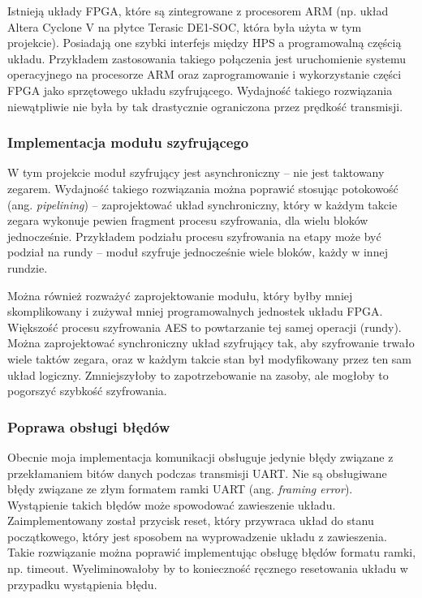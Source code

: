 Istnieją układy FPGA, które są zintegrowane z procesorem ARM (np. układ Altera Cyclone V na płytce Terasic DE1-SOC, która była użyta w tym projekcie). Posiadają one szybki interfejs między HPS a programowalną częścią układu. Przykładem zastosowania takiego połączenia jest uruchomienie systemu operacyjnego na procesorze ARM oraz zaprogramowanie i wykorzystanie części FPGA jako sprzętowego układu szyfrującego. Wydajność takiego rozwiązania niewątpliwie nie była by tak drastycznie ograniczona przez prędkość transmisji.

\subsubsection{Implementacja modułu szyfrującego}
W tym projekcie moduł szyfrujący jest asynchroniczny -- nie jest taktowany zegarem. Wydajność takiego rozwiązania można poprawić stosując potokowość (ang. \textit{pipelining}) -- zaprojektować układ synchroniczny, który w każdym takcie zegara wykonuje pewien fragment procesu szyfrowania, dla wielu bloków jednocześnie. Przykładem podziału procesu szyfrowania na etapy może być podział na rundy -- moduł szyfruje jednocześnie wiele bloków, każdy w innej rundzie.

Można również rozważyć zaprojektowanie modułu, który byłby mniej skomplikowany i zużywał mniej programowalnych jednostek układu FPGA. Większość procesu szyfrowania AES to powtarzanie tej samej operacji (rundy). Można zaprojektować synchroniczny układ szyfrujący tak, aby szyfrowanie trwało wiele taktów zegara, oraz w każdym takcie stan był modyfikowany przez ten sam układ logiczny. Zmniejszyłoby to zapotrzebowanie na zasoby, ale mogłoby to pogorszyć szybkość szyfrowania.

\subsubsection{Poprawa obsługi błędów}
Obecnie moja implementacja komunikacji obsługuje jedynie błędy związane z przekłamaniem bitów danych podczas transmisji UART. Nie są obsługiwane błędy związane ze złym formatem ramki UART (ang. \textit{framing error}). Wystąpienie takich błędów może spowodować zawieszenie układu. Zaimplementowany został przycisk reset, który przywraca układ do stanu początkowego, który jest sposobem na wyprowadzenie układu z zawieszenia. Takie rozwiązanie można poprawić implementując obsługę błędów formatu ramki, np. timeout. Wyeliminowałoby by to konieczność ręcznego resetowania układu w przypadku wystąpienia błędu.

